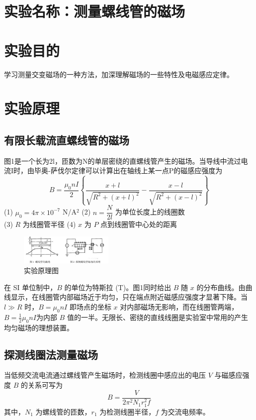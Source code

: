 \documentclass[12pt,a4paper]{article}
\begin{document}
	
	\section{实验名称：测量螺线管的磁场}
	
	\section{实验目的}
	学习测量交变磁场的一种方法，加深理解磁场的一些特性及电磁感应定律。

	\section{实验原理}
	\subsection{有限长载流直螺线管的磁场}
	图1是一个长为2l，匝数为N的单层密绕的直螺线管产生的磁场。当导线中流过电流I时，由毕奥-萨伐尔定律可以计算出在轴线上某一点P的磁感应强度为
		\begin{equation}
		B = \frac{\mu_0 n I}{2} \left\{ \frac{x+l}{\sqrt{R^2+(x+l)^2}} - \frac{x-l}{\sqrt{R^2+(x-l)^2}} \right\}
		\end{equation}
		(1) $\mu_0 = 4\pi\times10^{-7}$ N/A$^2$ \qquad (2) $n = \dfrac{N}{2l}$ 为单位长度上的线圈数\\
		(3) $R$ 为线圈管半径 \qquad (4) $x$ 为 $P$ 点到线圈管中心处的距离\\
		\begin{figure}[htbp]
			\centering
			\includegraphics[width=0.40\textwidth]{实验原理.png}
			\caption{实验原理图}
			\label{fig:chart1}
			\end{figure}
		在 SI 单位制中，$B$ 的单位为特斯拉 (T)。图1同时给出 $B$ 随 $x$ 的分布曲线。由曲线显示，在线圈管内部磁场近于均匀，只在端点附近磁感应强度才显著下降。当 $l \gg R$ 时，$B = \mu_0 n I$ 即场点的坐标 $x$ 对内部磁场无影响，而在线圈管两端，
		$B = \frac{1}{2}\mu_0 n I$为内部 $B$ 值的一半。无限长、密绕的直线线圈是实验室中常用的产生均匀磁场的理想装置。
	
	\subsection{探测线圈法测量磁场}
	当低频交流电流通过螺线管产生磁场时，检测线圈中感应出的电压 \(V\) 与磁感应强度 \(B\) 的关系可写为
	\begin{equation}\label{eq:B}
	B = \frac{V}{2\pi^2N_1r_1^2f} \tag{2}
	\end{equation}
	其中，\(N_1\) 为螺线管的匝数，\(r_1\) 为检测线圈半径，\(f\) 为交流电频率。
	
\end{document}
